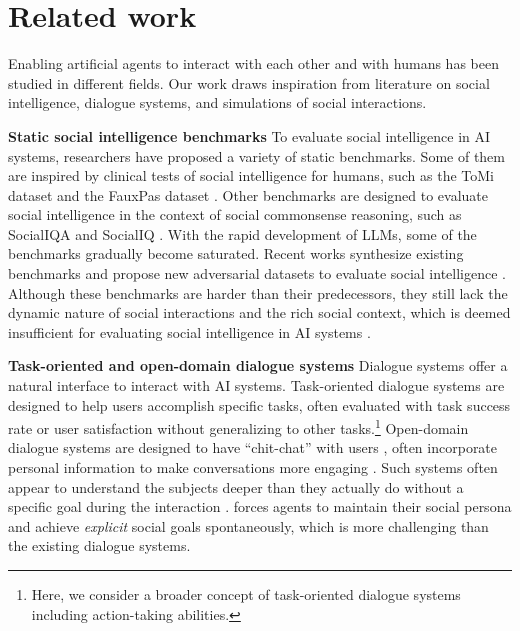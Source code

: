 \vspace{-5pt}
\section{Related work}
\vspace{-5pt}
Enabling artificial agents to interact with each other and with humans has been studied in different fields. Our work draws inspiration from literature on social intelligence, dialogue systems, and simulations of social interactions. 


\textbf{Static social intelligence benchmarks}
To evaluate social intelligence in AI systems, researchers have proposed a variety of static benchmarks. Some of them are inspired by clinical tests of social intelligence for humans, such as the ToMi dataset \citep{le-etal-2019-revisiting} and the FauxPas dataset \citep{shapira-etal-2023-well}. 
Other benchmarks are designed to evaluate social intelligence in the context of social commonsense reasoning, such as SocialIQA \citep{sap-etal-2019-social} and SocialIQ \citep{amir-etal-2023-social}. With the rapid development of LLMs, some of the benchmarks gradually become saturated. Recent works
synthesize existing benchmarks and propose new adversarial datasets to evaluate social intelligence \citep{shapira2023cleverHans,siq2}. Although these benchmarks are harder than their predecessors, they still lack the dynamic nature of social interactions and the rich social context, which is deemed insufficient for evaluating social intelligence in AI systems \citep{lee2023evaluating}.   





\textbf{Task-oriented and open-domain dialogue systems}
Dialogue systems offer a natural interface to interact with AI systems. 
Task-oriented dialogue systems are designed to help users accomplish specific tasks, often evaluated with task success rate or user satisfaction \citep{hosseiniasl2022simple, cecero2022meta, wang-etal-2019-persuasion} without generalizing to other tasks.\footnote{Here, we consider a broader concept of task-oriented dialogue systems including action-taking abilities.}
Open-domain dialogue systems are designed to have ``chit-chat'' with users \citep{kann-etal-2022-open, kim2023soda}, often incorporate personal information to make conversations more engaging \citep{zhang-etal-2018-personalizing, Liu2020YouIM,AitBaha2023ThePO,dogruoz-skantze-2021-open,skantze2023open}.
Such systems often appear to understand the subjects deeper than they actually do without a specific goal during the interaction \citep[Eliza effect]{weizenbaum1966eliza}.
\sotopia forces agents to maintain their social persona and achieve \textit{explicit} social goals spontaneously, which is more challenging than the existing dialogue systems.


